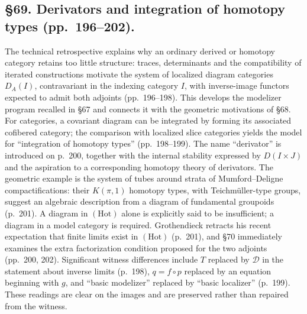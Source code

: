 \documentclass[10pt,oneside]{book}
\begin{document}
\subsection*{\S69. Derivators and integration of homotopy types (pp.\ 196--202).}
The technical retrospective explains why an ordinary derived or homotopy category retains too little structure: traces, determinants and the compatibility of iterated constructions motivate the system of localized diagram categories $D_A(I)$, contravariant in the indexing category $I$, with inverse-image functors expected to admit both adjoints (pp.\ 196--198). This develops the modelizer program recalled in \S67 and connects it with the geometric motivations of \S68. For categories, a covariant diagram can be integrated by forming its associated cofibered category; the comparison with localized slice categories yields the model for ``integration of homotopy types'' (pp.\ 198--199). The name ``derivator'' is introduced on p.\ 200, together with the internal stability expressed by $D(I\times J)$ and the aspiration to a corresponding homotopy theory of derivators. The geometric example is the system of tubes around strata of Mumford--Deligne compactifications: their $K(\pi,1)$ homotopy types, with Teichmüller-type groups, suggest an algebraic description from a diagram of fundamental groupoids (p.\ 201). A diagram in $(\mathrm{Hot})$ alone is explicitly said to be insufficient; a diagram in a model category is required. Grothendieck retracts his recent expectation that finite limits exist in $(\mathrm{Hot})$ (p.\ 201), and \S70 immediately examines the extra factorization condition proposed for the two adjoints (pp.\ 200, 202). Significant witness differences include $T$ replaced by $\mathscr D$ in the statement about inverse limits (p.\ 198), $q=f\circ p$ replaced by an equation beginning with $g$, and ``basic modelizer'' replaced by ``basic localizer'' (p.\ 199). These readings are clear on the images and are preserved rather than repaired from the witness.
\end{document}
